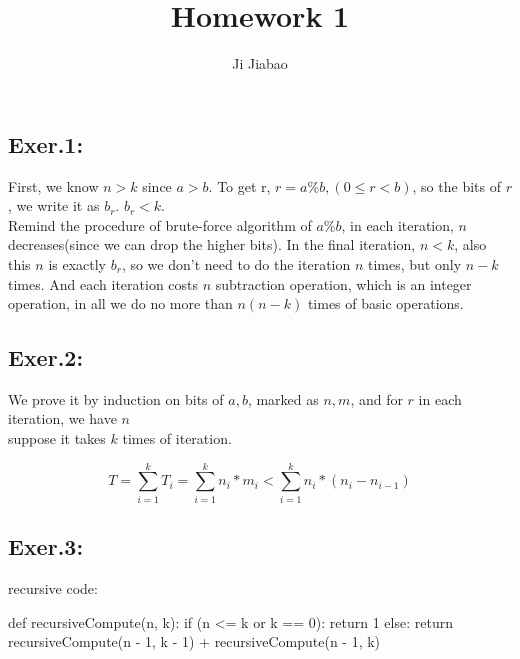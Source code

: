 \documentclass[UTF8]{ctexart}
\begin{document}
 

\title{Homework 1}
\author{Ji Jiabao}
\maketitle

\subsection*{Exer.1:}
First, we know $n > k$ since $a > b$. To get r, $r = a \% b, (0 \leq r < b)$,
so the bits of $r$, we write it as $b_r$. $b_r < k$.\\
Remind the procedure of brute-force algorithm of $a \% b$, in each iteration,
$n$ decreases(since we can drop the higher bits). In the final iteration, $n < k$,
also this $n$ is exactly $b_r$, so we don't need to do the iteration $n$ times,
but only $n - k$ times. And each iteration costs $n$ subtraction operation, which is an integer operation,
in all we do no more than $n(n - k)$ times of basic operations.

\subsection*{Exer.2:}
We prove it by induction on bits of $a, b$, marked as $n, m$, and for $r$ in each iteration,
we have $n$\\
suppose it takes $k$ times of iteration. 

\begin{equation*}
    T   = \sum_{i = 1}^k T_i
        = \sum_{i = 1}^k n_i * m_i
        < \sum_{i = 1}^k n_i *(n_i - n_{i - 1})
\end{equation*}

\newpage

\subsection*{Exer.3:}
recursive code: 
\begin{python}
def recursiveCompute(n, k):
    if (n <= k or k == 0):
        return 1
    else:
        return recursiveCompute(n - 1, k - 1) + recursiveCompute(n - 1, k)
\end{python}
\end{document}
